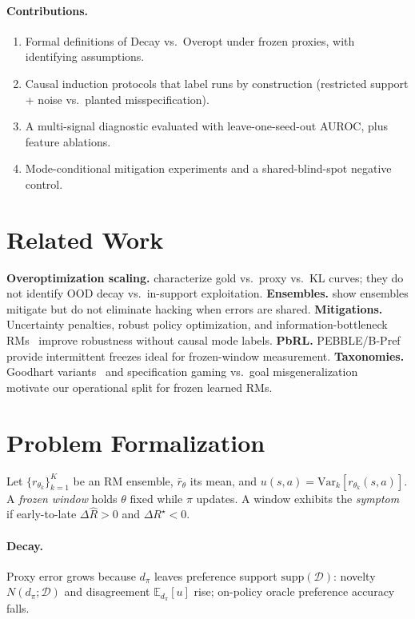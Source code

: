 \documentclass{article}
\begin{document}
\paragraph{Contributions.}
\begin{enumerate}[leftmargin=*]
  \item Formal definitions of Decay vs.\ Overopt under frozen proxies, with identifying assumptions.
  \item Causal induction protocols that label runs by construction (restricted support + noise vs.\ planted misspecification).
  \item A multi-signal diagnostic evaluated with leave-one-seed-out AUROC, plus feature ablations.
  \item Mode-conditional mitigation experiments and a shared-blind-spot negative control.
\end{enumerate}

\section{Related Work}
\textbf{Overoptimization scaling.}
\cite{gao2023scaling} characterize gold vs.\ proxy vs.\ KL curves; they do not identify OOD decay vs.\ in-support exploitation.
\textbf{Ensembles.}
\cite{eisenstein2024helping,coste2023reward} show ensembles mitigate but do not eliminate hacking when errors are shared.
\textbf{Mitigations.}
Uncertainty penalties, robust policy optimization, and information-bottleneck RMs~\citep{advpo2024,urm2024,inform2024} improve robustness without causal mode labels.
\textbf{PbRL.}
PEBBLE/B-Pref~\citep{lee2021pebble,lee2021bpref} provide intermittent freezes ideal for frozen-window measurement.
\textbf{Taxonomies.}
Goodhart variants~\citep{manheim2018categorizing} and specification gaming vs.\ goal misgeneralization~\citep{krakovna2020specification,langosco2022goal} motivate our operational split for frozen learned RMs.

\section{Problem Formalization}
Let $\{r_{\theta_k}\}_{k=1}^{K}$ be an RM ensemble, $\bar r_\theta$ its mean, and $u(s,a)=\mathrm{Var}_k[r_{\theta_k}(s,a)]$.
A \emph{frozen window} holds $\theta$ fixed while $\pi$ updates.
A window exhibits the \emph{symptom} if early-to-late $\Delta\hat R>0$ and $\Delta R^\star<0$.

\paragraph{Decay.}
Proxy error grows because $d_\pi$ leaves preference support $\mathrm{supp}(\mathcal{D})$: novelty $N(d_\pi;\mathcal{D})$ and disagreement $\mathbb{E}_{d_\pi}[u]$ rise; on-policy oracle preference accuracy falls.
\end{document}
